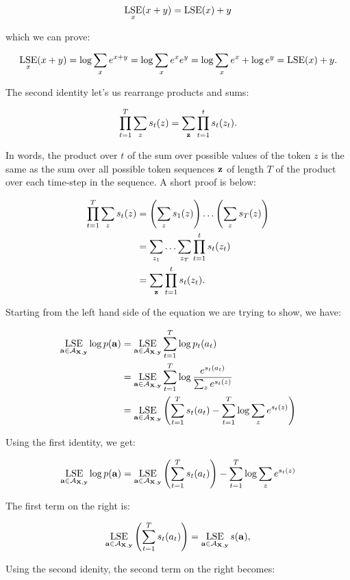 \begin{tcolorbox}[breakable, colback=white!95!black, colframe=white!45!black,
    sharp corners=all, title=Global or Local Normalization]
$$
\operatorname*{\textrm{LSE}}_x( x + y) = \operatorname*{\textrm{LSE}}(x) + y
$$

which we can prove:

$$
\operatorname*{\textrm{LSE}}_x (x + y) = \log \sum_x e^{x+y} = \log \sum_x e^x e^y = \log \sum_x e^x + \log e^y = \operatorname*{\textrm{LSE}}(x) + y.
$$

The second identity let's us rearrange products and sums:

$$
\prod_{t=1}^T \sum_{z} s_t(z) = \sum_{\bf z} \prod_{t=1}^t s_t(z_t).
$$

In words, the product over $t$ of the sum over possible values of the token $z$
is the same as the sum over all possible token sequences ${\bf z}$ of length $T$ of
the product over each time-step in the sequence. A short proof is below:

\begin{align*}
\prod_{t=1}^T \sum_{z} s_t(z) &= \left(\sum_{z} s_1(z)\right) \ldots \left(\sum_{z} s_T(z)\right) \\
&= \sum_{z_1} \ldots \sum_{z_T} \prod_{t=1}^t s_t(z_t) \\
&= \sum_{{\bf z}}\prod_{t=1}^t s_t(z_t).
\end{align*}

Starting from the left hand side of the equation we are trying to show, we have:

\begin{align*}
\operatorname*{\textrm{LSE}}_{{\bf a} \in \mathcal{A}_{{\bf X}, {\bf y}}} \log p({\bf a}) &= \operatorname*{\textrm{LSE}}_{{\bf a} \in \mathcal{A}_{{\bf X}, {\bf y}}} \sum_{t=1}^T \log p_t(a_t) \\
&= \operatorname*{\textrm{LSE}}_{{\bf a} \in \mathcal{A}_{{\bf X}, {\bf y}}} \sum_{t=1}^T \log \frac{e^{s_t(a_t)}}{\sum_z e^{s_t(z)}} \\
&= \operatorname*{\textrm{LSE}}_{{\bf a} \in \mathcal{A}_{{\bf X}, {\bf y}}} \left( \sum_{t=1}^T s_t(a_t) - \sum_{t=1}^T \log \sum_z e^{s_t(z)} \right)\\
\end{align*}

Using the first identity, we get:

\begin{align*}
\operatorname*{\textrm{LSE}}_{{\bf a} \in \mathcal{A}_{{\bf X}, {\bf y}}} \log p({\bf a}) &= \operatorname*{\textrm{LSE}}_{{\bf a} \in \mathcal{A}_{{\bf X}, {\bf y}}} \left( \sum_{t=1}^T s_t(a_t)\right) - \sum_{t=1}^T \log \sum_z e^{s_t(z)} \\
\end{align*}

The first term on the right is:

$$
\operatorname*{\textrm{LSE}}_{{\bf a} \in \mathcal{A}_{{\bf X}, {\bf y}}} \left( \sum_{t=1}^T s_t(a_t)\right) = \operatorname*{\textrm{LSE}}_{{\bf a} \in \mathcal{A}_{{\bf X}, {\bf y}}} s({\bf a}),
$$

Using the second idenity, the second term on the right becomes:


\end{tcolorbox}
